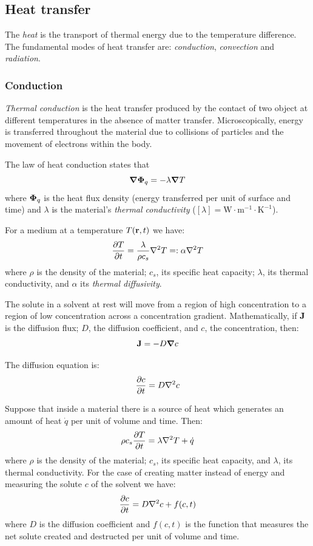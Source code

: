 \documentclass[../../../main.tex]{subfiles}
\begin{document}
\begin{multicols}{2}
  \subsection{Heat transfer}
  \begin{definition}[Heat]
    The \textit{heat} is the transport of thermal energy due to the temperature difference. The fundamental modes of heat transfer are: \textit{conduction}, \textit{convection} and \textit{radiation}.
  \end{definition}
  \subsubsection*{Conduction}
  \begin{definition}[Conduction]
    \textit{Thermal conduction} is the heat transfer produced by the contact of two object at different temperatures in the absence of matter transfer. Microscopically, energy is transferred throughout the material due to collisions of particles and the movement of electrons within the body.
  \end{definition}
  \begin{law}
    The law of heat conduction states that
    $$\grad\vb{\Phi}_q=-\lambda\grad T$$ where $\vb{\Phi}_q$ is the heat flux density (energy transferred per unit of surface and time) and $\lambda$ is the material's \textit{thermal conductivity} ($[\lambda]=\text{W}\cdot\text{m}^{-1}\cdot\text{K}^{-1}$).
  \end{law}
  \begin{prop}
    For a medium at a temperature $T(\vb{r},t)$ we have:
    $$\pdv{T}{t}=\frac{\lambda}{\rho c_s}\nabla^2 T=:\alpha\nabla^2 T$$
    where $\rho$ is the density of the material; $c_s$, its specific heat capacity; $\lambda$, its thermal conductivity, and $\alpha$ its \textit{thermal diffusivity}.
  \end{prop}
  \begin{law}
    The solute in a solvent at rest will move from a region of high concentration to a region of low concentration across a concentration gradient. Mathematically, if $\vb{J}$ is the diffusion flux; $D$, the diffusion coefficient, and $c$, the concentration, then:
    $$\vb{J}=-D\grad c$$
  \end{law}
  \begin{prop}
    The diffusion equation is: $$\pdv{c}{t}=D\nabla^2 c$$
  \end{prop}
  \begin{prop}
    Suppose that inside a material there is a source of heat which generates an amount of heat $\dot{q}$ per unit of volume and time. Then:
    $$\rho c_s\pdv{T}{t}=\lambda\nabla^2 T+\dot{q}$$
    where $\rho$ is the density of the material; $c_s$, its specific heat capacity, and $\lambda$, its thermal conductivity.
    For the case of creating matter instead of energy and measuring the solute $c$ of the solvent we have:
    $$\pdv{c}{t}=D\nabla^2 c+f(c,t)$$
    where $D$ is the diffusion coefficient and $f(c,t)$ is the function that measures the net solute created and destructed per unit of volume and time.
  \end{prop}

\end{multicols}
\end{document}
